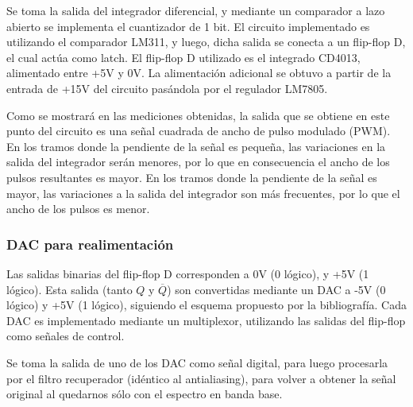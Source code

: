 \documentclass[assd_tp3_main.tex]{subfiles}
\begin{document}
Se toma la salida del integrador diferencial, y mediante un comparador a lazo abierto se implementa el cuantizador de 1 bit. El circuito implementado es utilizando el comparador LM311, y luego, dicha salida se conecta a un flip-flop D, el cual actúa como latch. El flip-flop D utilizado es el integrado CD4013, alimentado entre +5V y 0V. La alimentación adicional se obtuvo a partir de la entrada de +15V del circuito pasándola por el regulador LM7805.


Como se mostrará en las mediciones obtenidas, la salida que se obtiene en este punto del circuito es una señal cuadrada de ancho de pulso modulado (PWM). En los tramos donde la pendiente de la señal es pequeña, las variaciones en la salida del integrador serán menores, por lo que en consecuencia el ancho de los pulsos resultantes es mayor. En los tramos donde la pendiente de la señal es mayor, las variaciones a la salida del integrador son más frecuentes, por lo que el ancho de los pulsos es menor.

\subsubsection{DAC para realimentación}

Las salidas binarias del flip-flop D corresponden a 0V (0 lógico), y +5V (1 lógico). Esta salida (tanto $Q$ y $\overline{Q}$) son convertidas mediante un DAC a -5V (0 lógico) y +5V (1 lógico), siguiendo el esquema propuesto por la bibliografía. Cada DAC es implementado mediante un multiplexor, utilizando las salidas del flip-flop como señales de control.


Se toma la salida de uno de los DAC como señal digital, para luego procesarla por el filtro recuperador (idéntico al antialiasing), para volver a obtener la señal original al quedarnos sólo con el espectro en banda base.
\end{document}
